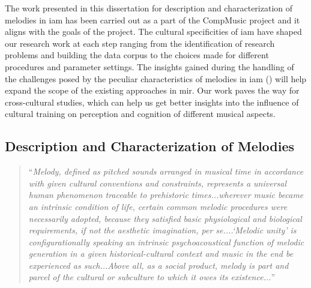The work presented in this dissertation for description and characterization of melodies in \gls{iam} has been carried out as a part of the CompMusic project and it aligns with the goals of the project. The cultural specificities of \gls{iam} have shaped our research work at each step ranging from the identification of research problems and building the data corpus to the choices made for different procedures and parameter settings. The insights gained during the handling of the challenges posed by the peculiar characteristics of melodies in \gls{iam} () will help expand the scope of the existing approaches in \gls{mir}. Our work paves the way for cross-cultural studies, which can help us get better insights into the influence of cultural training on perception and cognition of different musical aspects.



\subsection{Description and Characterization of Melodies}
\label{sec:intro_description_characterization_melodies}


\blockcquote{ringer2001melody}{``\textit{Melody, defined as pitched sounds arranged in musical time in accordance with given cultural conventions and constraints, represents a universal human phenomenon traceable to prehistoric times...wherever music became an intrinsic condition of life, certain common melodic procedures were necessarily adopted, because they satisfied basic physiological and biological requirements, if not the aesthetic imagination, per se....`Melodic unity' is configurationally speaking an intrinsic psychoacoustical function of melodic generation in a given historical-cultural context and music in the end be experienced as such...Above all, as a social product, melody is part and parcel of the cultural or subculture to which it owes its existence...}''}

